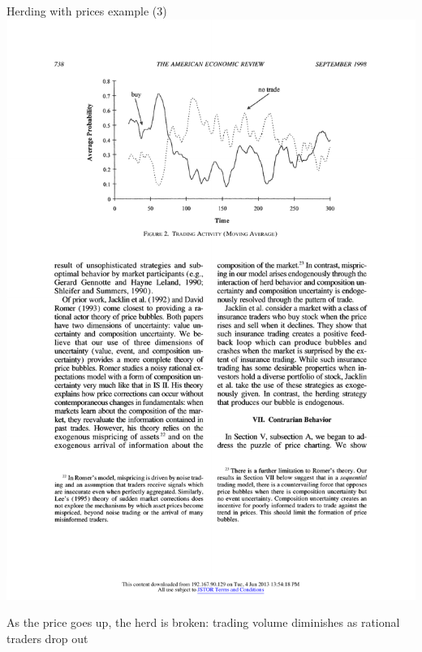 \documentclass[english,10pt
,aspectratio=169
]{beamer}
\begin{document}
\begin{frame}{Herding with prices example (3)}
	\includegraphics[width=0.17\paperwidth]{pics/Trade2} \hfill \hfill
	
	As the price goes up, the herd is broken: trading volume diminishes as rational traders drop out
\end{frame}
\end{document}
